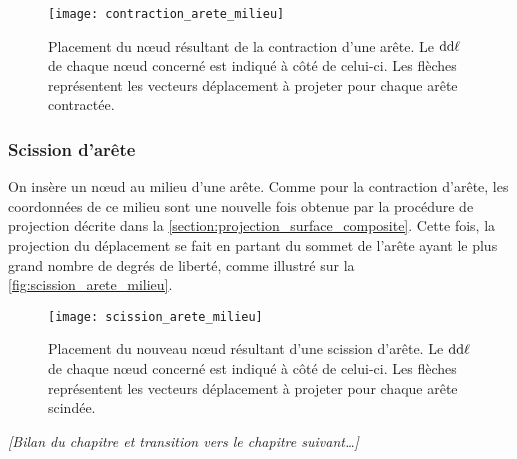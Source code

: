 \setlength{\imagewidth}{50mm}
\begin{figure}
  \centering
  \texttt{[image: contraction\_arete\_milieu]}
  \caption{Placement du n\oe ud résultant de la contraction d'une arête. Le $\mathrm{dd}\ell$ de chaque n\oe ud concerné est indiqué à côté de celui-ci. Les flèches représentent les vecteurs déplacement à projeter pour chaque arête contractée.}
  \label{fig:contraction_arete_milieu}
\end{figure}


\subsubsection{Scission d'arête}
On insère un n\oe ud au milieu d'une arête. Comme pour la contraction d'arête, les coordonnées de ce milieu sont une nouvelle fois obtenue par la procédure de projection décrite dans la \autoref{section:projection_surface_composite}.
Cette fois, la projection du déplacement se fait en partant du sommet de l'arête ayant le plus grand nombre de degrés de liberté, comme illustré sur la \autoref{fig:scission_arete_milieu}.

\setlength{\imagewidth}{50mm}
\begin{figure}
  \centering
  \texttt{[image: scission\_arete\_milieu]}
  \caption{Placement du nouveau n\oe ud résultant d'une scission d'arête. Le $\mathrm{dd}\ell$ de chaque n\oe ud concerné est indiqué à côté de celui-ci. Les flèches représentent les vecteurs déplacement à projeter pour chaque arête scindée.}
  \label{fig:scission_arete_milieu}
\end{figure}


\par\bigskip
\textit{
	[Bilan du chapitre et transition vers le chapitre suivant\ldots]
}
